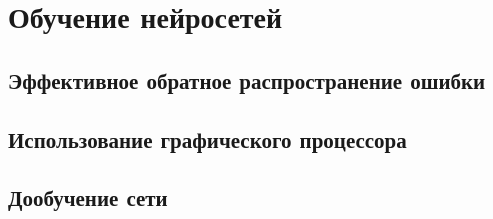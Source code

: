 \documentclass[a4paper,14pt]{extarticle} %
\begin{document}
\section{Обучение нейросетей}
\hspace{\parindent}

\subsection{Эффективное обратное распространение ошибки}
\hspace{\parindent}

\subsection{Использование графического процессора}
\hspace{\parindent}

\subsection{Дообучение сети}
\hspace{\parindent}

\newpage
\begin{flushleft}
\end{flushleft}
\end{document}
